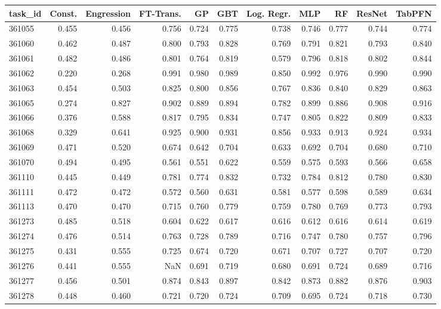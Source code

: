 \begin{tabular}{lrrrrrrrrrr}
\toprule
task\_id & Const. & Engression & FT-Trans. & GP & GBT & Log. Regr. & MLP & RF & ResNet & TabPFN \\
\midrule
361055 & 0.455 & 0.456 & 0.756 & 0.724 & 0.775 & 0.738 & 0.746 & 0.777 & 0.744 & 0.774 \\
361060 & 0.462 & 0.487 & 0.800 & 0.793 & 0.828 & 0.769 & 0.791 & 0.821 & 0.793 & 0.840 \\
361061 & 0.482 & 0.486 & 0.801 & 0.764 & 0.819 & 0.579 & 0.796 & 0.818 & 0.802 & 0.844 \\
361062 & 0.220 & 0.268 & 0.991 & 0.980 & 0.989 & 0.850 & 0.992 & 0.976 & 0.990 & 0.990 \\
361063 & 0.454 & 0.503 & 0.825 & 0.800 & 0.856 & 0.767 & 0.836 & 0.840 & 0.829 & 0.863 \\
361065 & 0.274 & 0.827 & 0.902 & 0.889 & 0.894 & 0.782 & 0.899 & 0.886 & 0.908 & 0.916 \\
361066 & 0.376 & 0.588 & 0.817 & 0.795 & 0.834 & 0.747 & 0.805 & 0.822 & 0.809 & 0.833 \\
361068 & 0.329 & 0.641 & 0.925 & 0.900 & 0.931 & 0.856 & 0.933 & 0.913 & 0.924 & 0.934 \\
361069 & 0.471 & 0.520 & 0.674 & 0.642 & 0.704 & 0.633 & 0.692 & 0.704 & 0.680 & 0.710 \\
361070 & 0.494 & 0.495 & 0.561 & 0.551 & 0.622 & 0.559 & 0.575 & 0.593 & 0.566 & 0.658 \\
361110 & 0.445 & 0.449 & 0.781 & 0.774 & 0.832 & 0.732 & 0.784 & 0.812 & 0.780 & 0.830 \\
361111 & 0.472 & 0.472 & 0.572 & 0.560 & 0.631 & 0.581 & 0.577 & 0.598 & 0.589 & 0.634 \\
361113 & 0.470 & 0.470 & 0.715 & 0.760 & 0.779 & 0.759 & 0.780 & 0.769 & 0.773 & 0.793 \\
361273 & 0.485 & 0.518 & 0.604 & 0.622 & 0.617 & 0.616 & 0.612 & 0.616 & 0.614 & 0.619 \\
361274 & 0.476 & 0.514 & 0.763 & 0.728 & 0.789 & 0.716 & 0.747 & 0.780 & 0.757 & 0.796 \\
361275 & 0.431 & 0.555 & 0.725 & 0.674 & 0.720 & 0.671 & 0.707 & 0.727 & 0.707 & 0.720 \\
361276 & 0.441 & 0.555 & NaN & 0.691 & 0.719 & 0.680 & 0.691 & 0.724 & 0.689 & 0.716 \\
361277 & 0.456 & 0.501 & 0.874 & 0.843 & 0.897 & 0.842 & 0.873 & 0.882 & 0.876 & 0.903 \\
361278 & 0.448 & 0.460 & 0.721 & 0.720 & 0.724 & 0.709 & 0.695 & 0.724 & 0.718 & 0.730 \\

\end{tabular}
